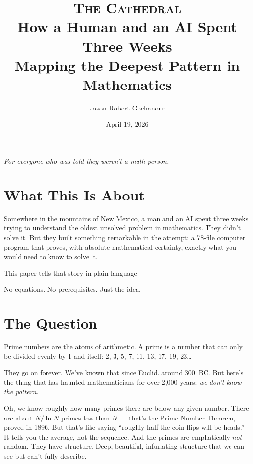 \documentclass[12pt,a4paper]{article}
\title{%
  \vspace{-1cm}
  {\Large\textsc{The Cathedral}}\\[0.3cm]
  {\large How a Human and an AI Spent Three Weeks\\
  Mapping the Deepest Pattern in Mathematics}%
}
\author{
  Jason Robert Gochanour
}
\date{April 19, 2026}
\begin{document}
\maketitle

\begin{center}
\emph{For everyone who was told they weren't a math person.}
\end{center}

\vspace{1cm}

\section*{What This Is About}

Somewhere in the mountains of New Mexico, a man and an AI spent three
weeks trying to understand the oldest unsolved problem in mathematics.
They didn't solve it. But they built something remarkable in the
attempt: a 78-file computer program that proves, with absolute
mathematical certainty, exactly what you would need to know to solve it.

This paper tells that story in plain language.

No equations. No prerequisites. Just the idea.

\section*{The Question}

Prime numbers are the atoms of arithmetic. A prime is a number that can
only be divided evenly by 1 and itself: 2, 3, 5, 7, 11, 13, 17, 19, 23\ldots

They go on forever. We've known that since Euclid, around 300~BC. But
here's the thing that has haunted mathematicians for over 2,000 years:
\emph{we don't know the pattern.}

Oh, we know roughly how many primes there are below any given number.
There are about $N / \ln N$ primes less than $N$ --- that's the
Prime Number Theorem, proved in 1896. But that's like saying ``roughly
half the coin flips will be heads.'' It tells you the average, not
the sequence. And the primes are emphatically \emph{not} random. They
have structure. Deep, beautiful, infuriating structure that we can see
but can't fully describe.
\end{document}
